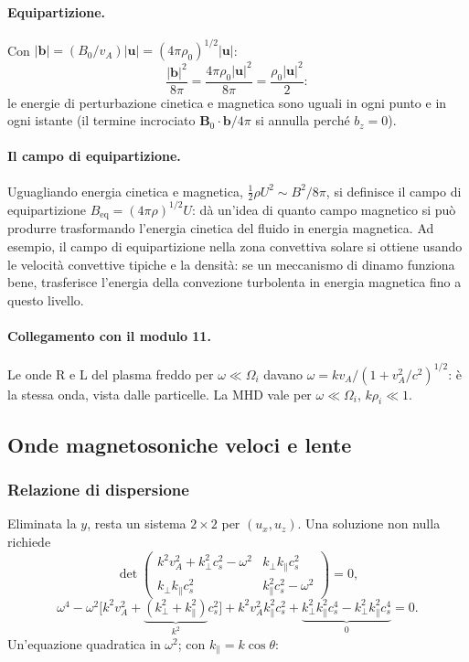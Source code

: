 \paragraph{Equipartizione.} Con $|\mathbf{b}|=(B_0/v_A)|\mathbf{u}|=(4\pi\rho_0)^{1/2}|\mathbf{u}|$:
\begin{equation}
\frac{|\mathbf{b}|^2}{8\pi}=\frac{4\pi\rho_0|\mathbf{u}|^2}{8\pi}=\frac{\rho_0|\mathbf{u}|^2}{2}:
\end{equation}
le energie di perturbazione cinetica e magnetica sono uguali in ogni punto e in ogni istante (il termine incrociato $\mathbf{B}_0\cdot\mathbf{b}/4\pi$ si annulla perché $b_z=0$).

\paragraph{Il campo di equipartizione.} Uguagliando energia cinetica e magnetica, $\tfrac12\rho U^2\sim B^2/8\pi$, si definisce il campo di equipartizione $B_{\mathrm{eq}}=(4\pi\rho)^{1/2}U$: dà un'idea di quanto campo magnetico si può produrre trasformando l'energia cinetica del fluido in energia magnetica. Ad esempio, il campo di equipartizione nella zona convettiva solare si ottiene usando le velocità convettive tipiche e la densità: se un meccanismo di dinamo funziona bene, trasferisce l'energia della convezione turbolenta in energia magnetica fino a questo livello.

\paragraph{Collegamento con il modulo 11.} Le onde R e L del plasma freddo per $\omega\ll\Omega_i$ davano $\omega=kv_A/(1+v_A^2/c^2)^{1/2}$: è la stessa onda, vista dalle particelle. La MHD vale per $\omega\ll\Omega_i$, $k\rho_i\ll1$.

\subsection{Onde magnetosoniche veloci e lente}

\subsubsection{Relazione di dispersione}

Eliminata la $y$, resta un sistema $2\times2$ per $(u_x,u_z)$. Una soluzione non nulla richiede
\begin{equation}
\det\begin{pmatrix}
k^2v_A^2+k_\perp^2c_s^2-\omega^2 & k_\perp k_\parallel c_s^2\\
k_\perp k_\parallel c_s^2 & k_\parallel^2c_s^2-\omega^2
\end{pmatrix}=0,
\end{equation}
\begin{equation}
\omega^4-\omega^2\Big[k^2v_A^2+\underbrace{(k_\perp^2+k_\parallel^2)}_{k^2}c_s^2\Big]+k^2v_A^2k_\parallel^2c_s^2+\underbrace{k_\perp^2k_\parallel^2c_s^4-k_\perp^2k_\parallel^2c_s^4}_{0}=0 .
\end{equation}
Un'equazione quadratica in $\omega^2$; con $k_\parallel=k\cos\theta$:

